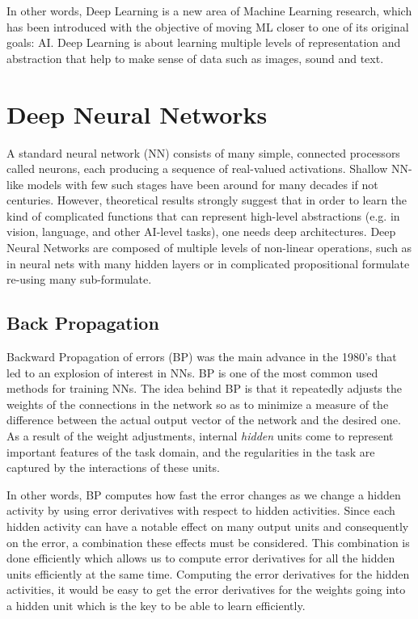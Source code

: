 In other words,  Deep Learning is a new area of Machine Learning research, which has been introduced with the objective of moving ML closer to one of its original goals: AI. Deep Learning is about learning multiple levels of representation and abstraction that help to make sense of data such as images, sound and text\cite{tutorial2014lisa}.  

\section{Deep Neural Networks}

A standard neural network (NN) consists of many simple, connected processors called neurons, each producing a sequence of real-valued activations. Shallow NN-like models with few such stages have been around for many decades if not centuries\cite{deepnn}. However, theoretical results strongly suggest that in order to learn the kind of complicated functions that can represent high-level abstractions (e.g. in vision, language, and other AI-level tasks), one needs deep architectures. Deep Neural Networks are composed of multiple levels of non-linear operations, such as in neural nets with many hidden layers or in complicated propositional formulate re-using many sub-formulate\cite{bengio2009learning}. 

\subsection{Back Propagation}

Backward Propagation of errors (BP) was the main advance in the 1980's that led to an explosion of interest in NNs. BP is one of the most common used methods for training NNs. The idea behind BP is that it repeatedly adjusts the weights of the connections in the network so as to minimize a measure of the difference between the actual output vector of the network and the desired one. As a result of the weight adjustments, internal \textit{hidden} units come to represent important features of the task domain, and the regularities in the task are captured by the interactions of these units\cite{williams1986learning}.

In other words, BP computes how fast the error changes as we change a hidden activity by using error derivatives with respect to hidden activities. Since each hidden activity can have a notable effect on many output units and consequently on the error, a combination these effects must be considered. This combination is done efficiently which allows us to compute error derivatives for all the hidden units efficiently at the same time.  Computing the error derivatives for the hidden activities, it would be easy to get the error derivatives for the weights going into a hidden unit which is the key to be able to learn efficiently. 

